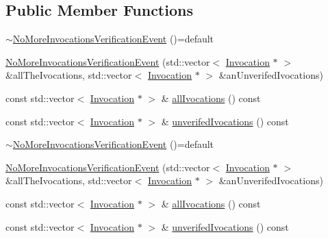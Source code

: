 \subsection*{Public Member Functions}
\begin{DoxyCompactItemize}
\item 
\mbox{\hyperlink{structfakeit_1_1NoMoreInvocationsVerificationEvent_a1db7bd8cb45dc62b87c744e628b93d4d}{$\sim$\+No\+More\+Invocations\+Verification\+Event}} ()=default
\item 
\mbox{\hyperlink{structfakeit_1_1NoMoreInvocationsVerificationEvent_a4c590fe7b3fb11f7121af65f4a0d3ed5}{No\+More\+Invocations\+Verification\+Event}} (std\+::vector$<$ \mbox{\hyperlink{structfakeit_1_1Invocation}{Invocation}} $\ast$ $>$ \&all\+The\+Ivocations, std\+::vector$<$ \mbox{\hyperlink{structfakeit_1_1Invocation}{Invocation}} $\ast$ $>$ \&an\+Unverifed\+Ivocations)
\item 
const std\+::vector$<$ \mbox{\hyperlink{structfakeit_1_1Invocation}{Invocation}} $\ast$ $>$ \& \mbox{\hyperlink{structfakeit_1_1NoMoreInvocationsVerificationEvent_aa69cf6dc4a816429653a5885f38d07b5}{all\+Ivocations}} () const
\item 
const std\+::vector$<$ \mbox{\hyperlink{structfakeit_1_1Invocation}{Invocation}} $\ast$ $>$ \& \mbox{\hyperlink{structfakeit_1_1NoMoreInvocationsVerificationEvent_aaff3cb0916a4fe853f6f4e5fcc7f2632}{unverifed\+Ivocations}} () const
\item 
\mbox{\hyperlink{structfakeit_1_1NoMoreInvocationsVerificationEvent_a1db7bd8cb45dc62b87c744e628b93d4d}{$\sim$\+No\+More\+Invocations\+Verification\+Event}} ()=default
\item 
\mbox{\hyperlink{structfakeit_1_1NoMoreInvocationsVerificationEvent_a4c590fe7b3fb11f7121af65f4a0d3ed5}{No\+More\+Invocations\+Verification\+Event}} (std\+::vector$<$ \mbox{\hyperlink{structfakeit_1_1Invocation}{Invocation}} $\ast$ $>$ \&all\+The\+Ivocations, std\+::vector$<$ \mbox{\hyperlink{structfakeit_1_1Invocation}{Invocation}} $\ast$ $>$ \&an\+Unverifed\+Ivocations)
\item 
const std\+::vector$<$ \mbox{\hyperlink{structfakeit_1_1Invocation}{Invocation}} $\ast$ $>$ \& \mbox{\hyperlink{structfakeit_1_1NoMoreInvocationsVerificationEvent_aa69cf6dc4a816429653a5885f38d07b5}{all\+Ivocations}} () const
\item 
const std\+::vector$<$ \mbox{\hyperlink{structfakeit_1_1Invocation}{Invocation}} $\ast$ $>$ \& \mbox{\hyperlink{structfakeit_1_1NoMoreInvocationsVerificationEvent_aaff3cb0916a4fe853f6f4e5fcc7f2632}{unverifed\+Ivocations}} () const

\end{DoxyCompactItemize}
